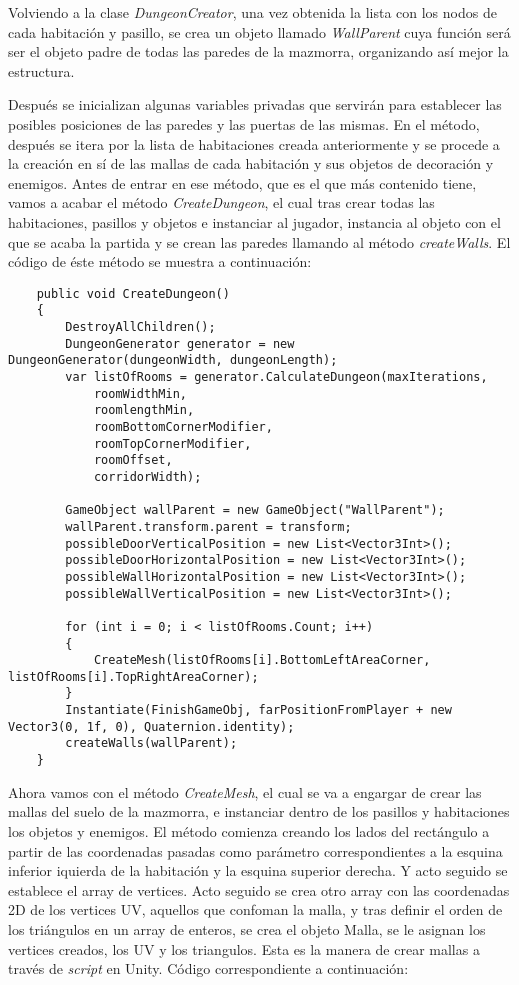 Volviendo a la clase \textit{DungeonCreator}, una vez obtenida la lista con los nodos de cada habitación y pasillo, se crea un objeto llamado \textit{WallParent} cuya función será ser el objeto padre de todas las paredes de la mazmorra, organizando así mejor la estructura.

Después se inicializan algunas variables privadas que servirán para establecer las posibles posiciones de las paredes y las puertas de las mismas. En el método, después se itera por la lista de habitaciones creada anteriormente y se procede a la creación en sí de las mallas de cada habitación y sus objetos de decoración y enemigos. Antes de entrar en ese método, que es el que más contenido tiene, vamos a acabar el método \textit{CreateDungeon}, el cual tras crear todas las habitaciones, pasillos y objetos e instanciar al jugador, instancia al objeto con el que se acaba la partida y se crean las paredes llamando al método \textit{createWalls}. El código de éste método se muestra a continuación: 

\begin{lstlisting}
    public void CreateDungeon()
    {
        DestroyAllChildren();
        DungeonGenerator generator = new DungeonGenerator(dungeonWidth, dungeonLength);
        var listOfRooms = generator.CalculateDungeon(maxIterations, 
            roomWidthMin, 
            roomlengthMin, 
            roomBottomCornerModifier, 
            roomTopCornerModifier, 
            roomOffset,
            corridorWidth);

        GameObject wallParent = new GameObject("WallParent");
        wallParent.transform.parent = transform;
        possibleDoorVerticalPosition = new List<Vector3Int>();
        possibleDoorHorizontalPosition = new List<Vector3Int>();
        possibleWallHorizontalPosition = new List<Vector3Int>();
        possibleWallVerticalPosition = new List<Vector3Int>();

        for (int i = 0; i < listOfRooms.Count; i++)
        {
            CreateMesh(listOfRooms[i].BottomLeftAreaCorner, listOfRooms[i].TopRightAreaCorner);
        }
        Instantiate(FinishGameObj, farPositionFromPlayer + new Vector3(0, 1f, 0), Quaternion.identity);
        createWalls(wallParent);
    }
\end{lstlisting}

Ahora vamos con el método \textit{CreateMesh}, el cual se va a engargar de crear las mallas del suelo de la mazmorra, e instanciar dentro de los pasillos y habitaciones los objetos y enemigos. El método comienza creando los lados del rectángulo a partir de las coordenadas pasadas como parámetro correspondientes a la esquina inferior iquierda de la habitación y la esquina superior derecha. Y acto seguido se establece el array de vertices. Acto seguido se crea otro array con las coordenadas 2D de los vertices UV, aquellos que confoman la malla, y tras definir el orden de los triángulos en un array de enteros, se crea el objeto Malla, se le asignan los vertices creados, los UV y los triangulos. Esta es la manera de crear mallas a través de \textit{script} en Unity. Código correspondiente a continuación:

